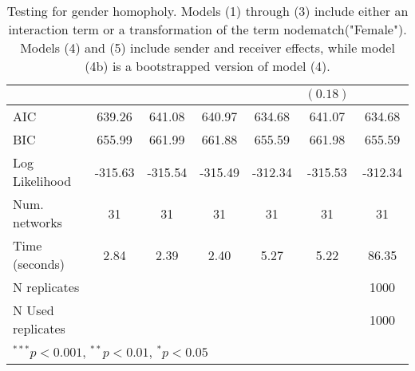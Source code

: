 \begin{table}[tb]
\begin{tabular}{l c c c c c c }
                          &               &               &               &               & $(0.18)$      &               \\
\midrule
AIC                       & 639.26        & 641.08        & 640.97        & 634.68        & 641.07        & 634.68        \\
BIC                       & 655.99        & 661.99        & 661.88        & 655.59        & 661.98        & 655.59        \\
Log Likelihood            & -315.63       & -315.54       & -315.49       & -312.34       & -315.53       & -312.34       \\
Num. networks             & 31            & 31            & 31            & 31            & 31            & 31            \\
Time (seconds)            & 2.84          & 2.39          & 2.40          & 5.27          & 5.22          & 86.35         \\
N replicates              &               &               &               &               &               & 1000          \\
N Used replicates         &               &               &               &               &               & 1000          \\
\bottomrule
\multicolumn{7}{l}{\scriptsize{$^{***}p<0.001$, $^{**}p<0.01$, $^*p<0.05$}}
\end{tabular}
\caption{Testing for gender homopholy. Models (1) through (3) include either an interaction term or a transformation of the term nodematch("Female"). Models (4) and (5) include sender and receiver effects, while model (4b) is a bootstrapped version of model (4).}
\label{tab:ci-ergm-full}
\end{table}
